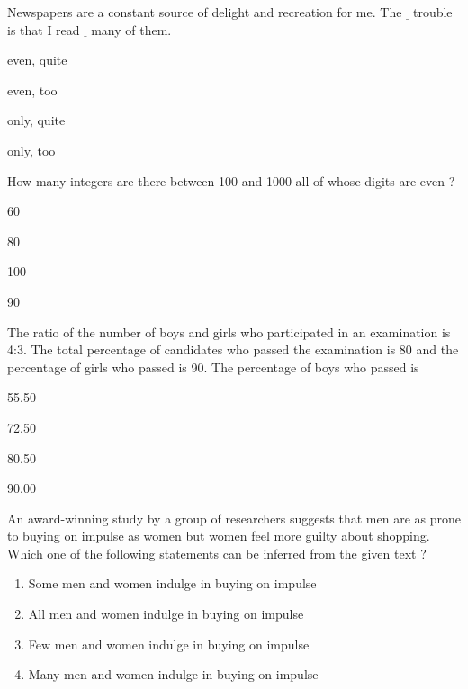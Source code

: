 	\item Newspapers are a constant source of delight and recreation for me. The $\underline{   }$ trouble is that I read $\underline{   }$ many of them.
		\begin{enumerate}
		\end{enumerate}
	\item How many integers are there between 100 and 1000 all of whose digits are even ?
		\begin{enumerate}
				\begin{multicols}{4}
				\item 60
				\item 80
				\item 100
				\item 90
				\end{multicols}
		\end{enumerate}
	\item The ratio of the number of boys and girls who participated in an examination is 4:3. The total percentage of candidates who passed the examination is 80 and the percentage of girls who passed is 90. The percentage of boys who passed is
		\begin{enumerate}
				\begin{multicols}{4}
				\item 55.50
				\item 72.50
				\item 80.50
				\item 90.00
				\end{multicols}
		\end{enumerate}
	\item An award-winning study by a group of researchers suggests that men are as prone to buying on impulse as women but women feel more guilty about shopping.\\
		Which one of the following statements can be inferred from the given text ?
		\begin{enumerate}
			\item Some men and women indulge in buying on impulse
			\item All men and women indulge in buying on impulse
			\item Few men and women indulge in buying on impulse
			\item Many men and women indulge in buying on impulse
		\end{enumerate}
